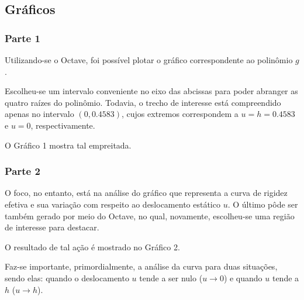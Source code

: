\documentclass[a4paper, 12pt]{article}
\begin{document}
	\newpage
	
	\subsection{Gráficos}
	
	\subsubsection{Parte 1}
	
	Utilizando-se o Octave, foi possível plotar o gráfico correspondente ao polinômio $g$. 
	
	Escolheu-se um intervalo 
	conveniente no eixo das abcissas para poder abranger as quatro raízes do polinômio. Todavia, o trecho de interesse
	está compreendido apenas no intervalo $(0,0.4583)$, cujos extremos correspondem a $u=h=0.4583$ e $u=0$, respectivamente.
	
	O Gráfico 1 mostra tal empreitada.
	
	\subsubsection{Parte 2}
	
	O foco, no entanto, está na análise do gráfico que representa a curva de rigidez efetiva e sua variação com respeito 
	ao deslocamento	estático $u$. O último pôde ser também gerado por meio do Octave, no qual, novamente, escolheu-se uma 
	região de interesse	para destacar.
	
	O resultado de tal ação é mostrado no Gráfico 2.
	
	Faz-se importante, primordialmente, a análise da curva para duas situações, sendo elas: quando o deslocamento $u$ tende
	a ser nulo ($u\rightarrow 0$) e quando $u$ tende a $h$ ($u\rightarrow h$).
			
\end{document}
